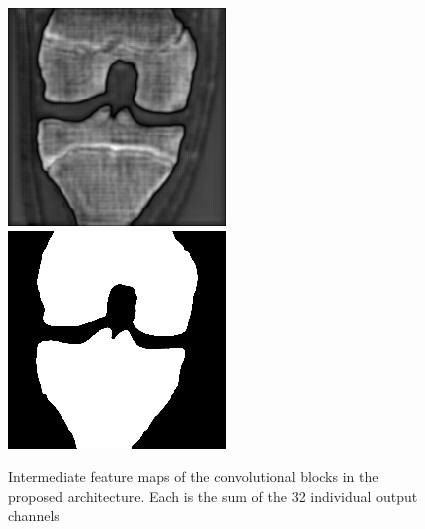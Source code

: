 \begin{figure}[H]
\endminipage\hfill
{}%
  \includegraphics[width=\linewidth]{imgs/up4.png}
\endminipage\hfill
{}%
  \includegraphics[width=\linewidth]{imgs/z_output.png}
\endminipage
\caption{Intermediate feature maps of the convolutional blocks in the proposed architecture. Each is the sum of the 32 individual output channels}
\end{figure}

